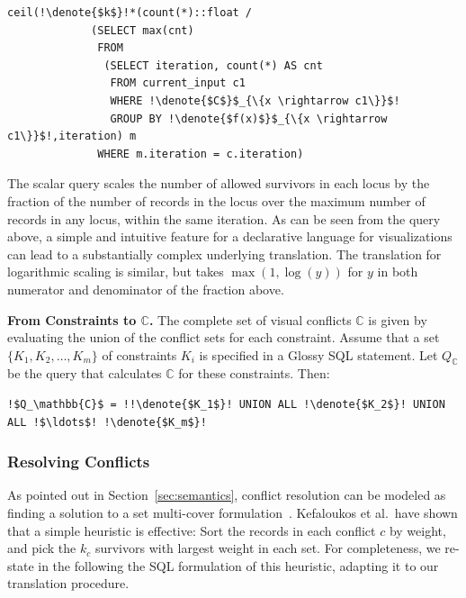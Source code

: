 \documentclass[11pt, oneside]{report}
\newcommand{\minisec}[1]{\noindent\textbf{#1.}}
\newcommand{\denote}[1]{\text{$[\![ $#1$ ]\!]$}}
\begin{document}
\begin{lstlisting}[mathescape,escapechar=!]
  ceil(!\denote{$k$}!*(count(*)::float / 
             (SELECT max(cnt)
              FROM 
               (SELECT iteration, count(*) AS cnt 
                FROM current_input c1
                WHERE !\denote{$C$}$_{\{x \rightarrow c1\}}$!
                GROUP BY !\denote{$f(x)$}$_{\{x \rightarrow c1\}}$!,iteration) m              
              WHERE m.iteration = c.iteration)           
\end{lstlisting} 


The scalar query scales the number of allowed survivors in each locus by the fraction of the number of records in the locus over the maximum number of records in any locus, within the same iteration. As can be seen from the query above, a simple and intuitive feature for a declarative language for visualizations can lead to a substantially complex underlying translation. The translation for logarithmic scaling is similar, but takes $\max(1,\log(y))$ for $y$ in both numerator and denominator of the fraction above. 

\minisec{From Constraints to $\mathbb{C}$}
The complete set of visual conflicts $\mathbb{C}$ is given by evaluating the union of the conflict sets for each constraint. Assume that a set $\{K_1, K_2, \ldots, K_m\}$ of constraints $K_i$ is specified in a Glossy SQL statement. Let $Q_\mathbb{C}$ be the query that calculates $\mathbb{C}$ for these constraints. Then:

\begin{lstlisting}[escapechar=\!]  
   !$Q_\mathbb{C}$ = !!\denote{$K_1$}! UNION ALL !\denote{$K_2$}! UNION ALL !$\ldots$! !\denote{$K_m$}! 
\end{lstlisting} 

\subsubsection{Resolving Conflicts}
\label{sec:resolve:conflicts}  

As pointed out in Section~\ref{sec:semantics}, conflict resolution can be modeled as finding a solution to a set multi-cover formulation~\cite{KefaloukosSZ14:CVL}. Kefaloukos et al.~have shown that a simple heuristic is effective: Sort the records in each conflict $c$ by weight, and pick the $k_c$ survivors with largest weight in each set. For completeness, we re-state in the following the SQL formulation of this heuristic, adapting it to our translation procedure.
\end{document}
